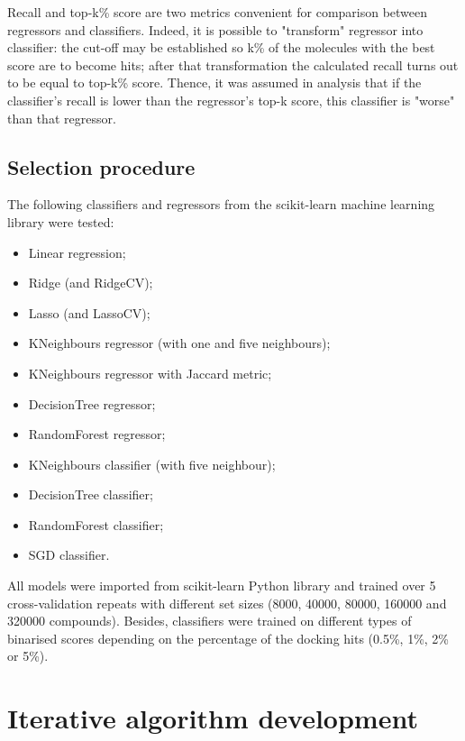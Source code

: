 Recall and top-k\% score are two metrics convenient for comparison between regressors 
and classifiers.
Indeed, it is possible to "transform" regressor into classifier: the cut-off may 
be established so k\% of the molecules with the best score are to become hits; after 
that transformation the calculated recall turns out to be equal to top-k\% score.
Thence, it was assumed in analysis that if the classifier's recall is lower than 
the regressor's top-k score, this classifier is "worse" than that regressor.\\

\subsection{Selection procedure}

The following classifiers and regressors from the scikit-learn machine learning library were tested:
\begin{itemize}
    \item Linear regression;
    \item Ridge (and RidgeCV);
    \item Lasso (and LassoCV);
    \item KNeighbours regressor (with one and five neighbours);
    \item KNeighbours regressor with Jaccard metric;
    \item DecisionTree regressor;
    \item RandomForest regressor;
    \item KNeighbours classifier (with five neighbour);
    \item DecisionTree classifier;
    \item RandomForest classifier;
    \item SGD classifier.
\end{itemize}

All models were imported from scikit-learn Python library and trained over 5 cross-validation 
repeats with different set sizes (8000, 40000, 80000, 160000 and 320000 compounds).
Besides, classifiers were trained on different types of binarised scores depending 
on the percentage of the docking hits (0.5\%, 1\%, 2\% or 5\%).


\section{Iterative algorithm development}


